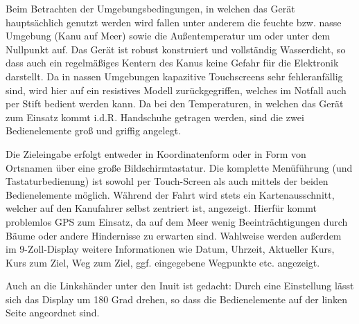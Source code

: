 \documentclass[a4paper,10pt]{article}
\begin{document}
\begin{enumerate}
	Beim Betrachten der Umgebungsbedingungen, in welchen das Gerät hauptsächlich genutzt werden wird fallen unter anderem die feuchte bzw. nasse Umgebung (Kanu auf Meer) sowie die Außentemperatur um oder unter dem Nullpunkt auf. Das Gerät ist robust konstruiert und vollständig Wasserdicht, so dass auch ein regelmäßiges Kentern des Kanus keine Gefahr für die Elektronik darstellt. Da in nassen Umgebungen kapazitive Touchscreens sehr fehleranfällig sind, wird hier auf ein resistives Modell zurückgegriffen, welches im Notfall auch per Stift bedient werden kann. Da bei den Temperaturen, in welchen das Gerät zum Einsatz kommt i.d.R. Handschuhe getragen werden, sind die zwei Bedienelemente groß und griffig angelegt.
	
	Die Zieleingabe erfolgt entweder in Koordinatenform oder in Form von Ortsnamen über eine große Bildschirmtastatur. Die komplette Menüführung (und Tastaturbedienung) ist sowohl per Touch-Screen als auch mittels der beiden Bedienelemente möglich. Während der Fahrt wird stets ein Kartenausschnitt, welcher auf den Kanufahrer selbst zentriert ist, angezeigt. Hierfür kommt problemlos GPS zum Einsatz, da auf dem Meer wenig Beeinträchtigungen durch Bäume oder andere Hindernisse zu erwarten sind. Wahlweise werden außerdem im 9-Zoll-Display weitere Informationen wie Datum, Uhrzeit, Aktueller Kurs, Kurs zum Ziel, Weg zum Ziel, ggf. eingegebene Wegpunkte etc. angezeigt. 
	
	Auch an die Linkshänder unter den Inuit ist gedacht: Durch eine Einstellung lässt sich das Display um 180 Grad drehen, so dass die Bedienelemente auf der linken Seite angeordnet sind. 
\end{enumerate}
\end{document}
